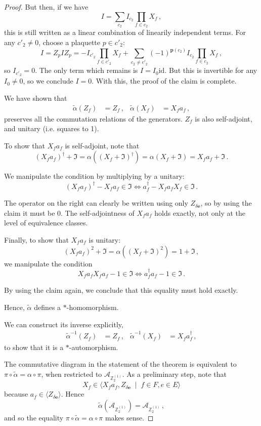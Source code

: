 \documentclass[aps,twocolumn,prx,floatfix,preprintnumbers, nofootinbib,10pt]{revtex4-2}
\numberwithin{equation}{section}
\theoremstyle{definition}
\theoremstyle{remark}
\theoremstyle{claim}
\newcommand{\be}{\begin{equation}}
\newcommand{\ee}{\end{equation}}
\newcommand{\id}{\text{id}}
\newcommand{\Z}{{\mathbb Z}}
\newcommand{\mc}[1]{\mathcal{#1}}
\newcommand{\paren}[1]{\left( #1 \right)}
\begin{document}
\begin{proof}
 But then, if we have
 \be
 I = \sum_{c_2} I_{c_2} \prod_{f \in c_2} X_f \,,
 \ee
 this is still written as a linear combination of linearily independent terms. For any $c'_2 \neq 0$, choose a plaquette $p \in c'_2$:
 \be
 I = Z_p I Z_p = - I_{c'_2} \prod_{f \in c'_2} X_f + \sum_{c_2 \neq c'_2} (-1)^{\bm{p}(c_2)} I_{c_2} \prod_{f \in c_2} X_f \,,
 \ee
 so $I_{c'_2} = 0$. The only term which remains is $I = I_0 \id{}$. But this is invertible for any $I_0 \neq 0$, so we conclude $I = 0$. With this, the proof of the claim is complete.
 
 We have shown that
 \begin{align}
  \tilde{\alpha}(Z_f) &= Z_f \,, & \tilde{\alpha}(X_f) &= X_f a_f \,,
 \end{align}
 preserves all the commutation relations of the generators. $Z_f$ is also self-adjoint, and unitary (i.e. squares to 1).

 To show that $X_f a_f$ is self-adjoint, note that
 \be
 (X_f a_f)^\dag + \mathfrak{I} = \alpha\paren{(X_f + \mathfrak{I})^\dag} = \alpha\paren{X_f + \mathfrak{I}} = X_f a_f + \mathfrak{I} \,.
 \ee

 We manipulate the condition by multiplying by a unitary:
 \be
 (X_f a_f)^\dag - X_f a_f \in \mathfrak{I} \iff a_f^\dag - X_f a_f X_f \in \mathfrak{I} \,.
 \ee

 The operator on the right can clearly be written using only $Z_{\delta \bm{e}}$, so by using the claim it must be $0$. The self-adjointness of $X_f a_f$ holds exactly, not only at the level of equivalence classes.

 Finally, to show that $X_f a_f$ is unitary:
 \be
 (X_f a_f)^2 + \mathfrak{I} = \alpha\paren{(X_f + \mathfrak{I})^2} = 1 + \mathfrak{I} \,,
 \ee
 we manipulate the condition
 \be
 X_f a_f X_f a_f - 1 \in \mathfrak{I} \iff a_f^\dag a_f - 1 \in \mathfrak{I} \,.
 \ee

 By using the claim again, we conclude that this equality must hold exactly.

 Hence, $\tilde{\alpha}$ defines a $*$-homomorphism.

 We can construct its inverse explicitly,
 \begin{align}
  \tilde{\alpha}^{-1}(Z_f) &= Z_f \,, & \tilde{\alpha}^{-1}(X_f) &= X_f a_f^\dag \,,
 \end{align}
 to show that it is a $*$-automorphism.

 The commutative diagram in the statement of the theorem is equivalent to $\pi \circ \tilde{\alpha} = \alpha \circ \pi$, when restricted to $\mc{A}_{\Z_2^{(1)}}$. As a preliminary step, note that
 \be
 X_f \in \langle X_f a_f, Z_{\delta \bm{e}} \; \mid \; f \in F, e \in E \rangle
 \ee
 because $a_f \in \langle Z_{\delta \bm{e}} \rangle$. Hence
 \be
 \tilde{\alpha} \paren{\mc{A}_{\Z_2^{(1)}}} = \mc{A}_{\Z_2^{(1)}} \,,
 \ee
 and so the equality $\pi \circ \tilde{\alpha} = \alpha \circ \pi$ makes sense.
 

\end{proof}
\end{document}

